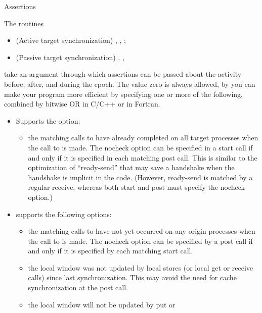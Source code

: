 {Assertions}
\label{sec:mpi-assert}

The routines
\begin{itemize}
\item (Active target synchronization)
  ,
  ,
  ;
\item (Passive target synchronization)
  ,
  ,
\end{itemize}
take an argument
through which assertions can be passed about the activity before, after, and during the epoch.
The value zero is always allowed, by you can make your program more efficient by specifying
one or more of the following, combined by bitwise OR in C/C++ or
 in Fortran.

\begin{itemize}
\item {} Supports the option:
  \begin{itemize}
    \item {} the matching calls to  have already
    completed on all target processes when the call to  is
    made. The nocheck option can be specified in a start call if and
    only if it is specified in each matching post call. This is similar
    to the optimization of ``ready-send'' that may save a handshake when
    the handshake is implicit in the code. (However, ready-send is
    matched by a regular receive, whereas both start and post must
    specify the nocheck option.)
  \end{itemize}
\item {} supports the following options:
  \begin{itemize}
  \item {} the matching calls to  have not
    yet occurred on any origin processes when the call to 
    is made. The nocheck option can be specified by a post call if and
    only if it is specified by each matching start call.
  \item {} the local window was not updated by local
    stores (or local get or receive calls) since last
    synchronization. This may avoid the need for cache synchronization
    at the post call.
  \item {} the local window will not be updated by put or

\end{itemize}
\end{itemize}
